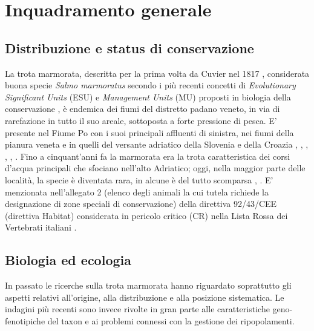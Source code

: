 \documentclass[10pt,twoside,openany,x11names,svgnames,italian,a5paper,dvipsnames,table]{memoir}
\newcommand\chapterillustration{}
\begin{document}



\normalsize  
\setlength\afterchapskip{55mm}
\chapter{Inquadramento generale}
\renewcommand\chapterillustration{1.jpg}

\section{Distribuzione e status di conservazione}
La trota marmorata, descritta per la prima volta da Cuvier nel 1817 \cite{Cuvier}, considerata buona specie \emph{Salmo marmoratus} secondo i più recenti concetti di \emph{Evolutionary Significant Units} (ESU) e \emph{Management Units} (MU) proposti in biologia della conservazione \cite{AAVV13}, è endemica dei fiumi del distretto padano veneto, in via di rarefazione in tutto il suo areale, sottoposta a forte pressione di pesca. E’ presente nel Fiume Po con i suoi principali affluenti di sinistra, nei fiumi della pianura veneta e in quelli del versante adriatico della Slovenia e della Croazia \cite{Delpino}, \cite{Pomini39}, \cite{Pomini40}, \cite{Sommani61}, \cite{Sommani66}, \cite{AAVV00}. Fino a cinquant’anni fa la marmorata era la trota caratteristica dei corsi d'acqua principali che sfociano nell'alto Adriatico; oggi, nella maggior parte delle località, la specie è diventata rara, in alcune è del tutto scomparsa \cite{Zerunian02}, \cite{Turin06}. E’ menzionata nell’allegato 2 (elenco degli animali la cui tutela richiede la designazione di zone speciali di conservazione) della direttiva 92/43/CEE (direttiva Habitat) considerata in pericolo critico (CR) nella Lista Rossa dei Vertebrati italiani \cite{Betti} \cite{Rondinini}.


\section{Biologia ed ecologia}
\begin{comment}
\begin{wrapfigure}{r}{.6\textwidth}
\begin{center}
\texttt{[image: ]}
\caption*{}
\end{center}
\end{wrapfigure}
\end{comment}
In passato le ricerche sulla trota marmorata hanno riguardato soprattutto gli aspetti relativi all'origine, alla distribuzione e alla posizione sistematica. Le indagini più recenti sono invece rivolte in gran parte alle caratteristiche geno-fenotipiche del taxon e ai problemi connessi con la gestione dei ripopolamenti.
\end{document}
